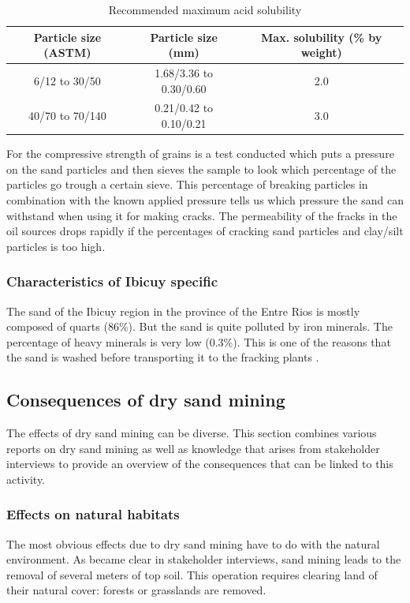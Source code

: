 \begin{table}[h!]
\centering
\begin{tabular}{|c|c|c|}
\hline
\textbf{Particle size (ASTM)} & \textbf{Particle size (mm)} & \textbf{Max. solubility (\% by weight)} \\ \hline
6/12 to 30/50 & 1.68/3.36 to 0.30/0.60 & 2.0 \\ \hline
40/70 to 70/140 & 0.21/0.42 to 0.10/0.21 & 3.0 \\ \hline
\end{tabular}
\caption{Recommended maximum acid solubility \autocite{secretariadepoliticamineraArenasParaFracking2019}}
\label{tab:acid}
\end{table}

For the compressive strength of grains is a test conducted which puts a pressure on the sand particles and then sieves the sample to look which percentage of the particles go trough a certain sieve. This percentage of breaking particles in combination with the known applied pressure tells us which pressure the sand can withstand when using it for making cracks.
The permeability of the fracks in the oil sources drops rapidly if the percentages of cracking sand particles and clay/silt particles is too high. 

\subsubsection{Characteristics of Ibicuy specific}

The sand of the Ibicuy region in the province of the Entre Rios is mostly composed of quarts (86\%). But the sand is quite polluted by iron minerals. The percentage of heavy minerals is very low (0.3\%). This is one of the reasons that the sand is washed before transporting it to the fracking plants \autocite{secretariadepoliticamineraArenasParaFracking2019}. 

\subsection{Consequences of dry sand mining}
The effects of dry sand mining can be diverse. This section combines various reports on dry sand mining as well as knowledge that arises from stakeholder interviews to provide an overview of the consequences that can be linked to this activity.

\subsubsection{Effects on natural habitats}
The most obvious effects due to dry sand mining have to do with the natural environment. As became clear in stakeholder interviews, sand mining leads to the removal of several meters of top soil. This operation requires clearing land of their natural cover: forests or grasslands are removed.

